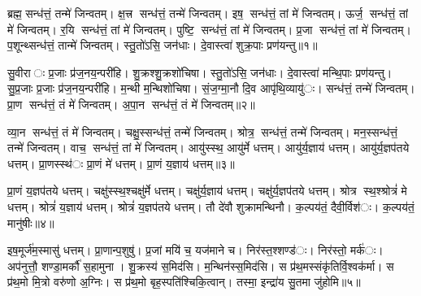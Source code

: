 




ब्रह्म॒ सन्ध॑त्तं॒ तन्मे॑ जिन्वतम्। क्ष॒त्त्र सन्ध॑त्तं॒ तन्मे॑ जिन्वतम्। इष॒ सन्ध॑त्तं॒ तां मे॑ जिन्वतम्। ऊर्ज॒ सन्ध॑त्तं॒ तां मे॑ जिन्वतम्। र॒यि सन्ध॑त्तं॒ तां मे॑ जिन्वतम्। पुष्टि॒ सन्ध॑त्तं॒ तां मे॑ जिन्वतम्। प्र॒जा सन्ध॑त्तं॒ तां मे॑ जिन्वतम्। प॒शून्थ्सन्ध॑त्तं॒ तान्मे॑ जिन्वतम्। स्तु॒तो॑ऽसि॒ जन॑धाः। दे॒वास्त्वा॑ शुक्र॒पाः प्रण॑यन्तु॥१॥

सु॒वीराः प्र॒जाः प्र॑ज॒नय॒न्परी॑हि। शु॒क्रश्शु॒क्रशो॑चिषा। स्तु॒तो॑ऽसि॒ जन॑धाः। दे॒वास्त्वा॑ मन्थि॒पाः प्रण॑यन्तु। सु॒प्र॒जाः प्र॒जाः प्र॑ज॒नय॒न्परी॑हि। म॒न्थी म॒न्थिशो॑चिषा। सं॒ज॒ग्मा॒नौ दि॒व आपृ॑थि॒व्यायु॑ः। सन्ध॑त्तं॒ तन्मे॑ जिन्वतम्। प्रा॒ण सन्ध॑त्तं॒ तं मे॑ जिन्वतम्। अ॒पा॒न सन्ध॑त्तं॒ तं मे॑ जिन्वतम्॥२॥

व्या॒न सन्ध॑त्तं॒ तं मे॑ जिन्वतम्। चक्षु॒स्सन्ध॑त्तं॒ तन्मे॑ जिन्वतम्। श्रोत्र॒ सन्ध॑त्तं॒ तन्मे॑ जिन्वतम्। मन॒स्सन्ध॑त्तं॒ तन्मे॑ जिन्वतम्। वाच॒ सन्ध॑त्तं॒ तां मे॑ जिन्वतम्। आयु॑स्स्थ॒ आयु॑र्मे धत्तम्। आयु॑र्य॒ज्ञाय॑ धत्तम्। आयु॑र्य॒ज्ञप॑तये धत्तम्। प्रा॒णस्स्थ॑ः प्रा॒णं मे॑ धत्तम्। प्रा॒णं य॒ज्ञाय॑ धत्तम्॥३॥

प्रा॒णं य॒ज्ञप॑तये धत्तम्। चक्षु॑स्स्थ॒श्चक्षु॑र्मे धत्तम्। चक्षु॑र्य॒ज्ञाय॑ धत्तम्। चक्षु॑र्य॒ज्ञप॑तये धत्तम्। श्रोत्र स्थ॒श्श्रोत्रं॑ मे धत्तम्। श्रोत्रं॑ य॒ज्ञाय॑ धत्तम्। श्रोत्रं॑ य॒ज्ञप॑तये धत्तम्। तौ दे॑वौ शुक्रामन्थिनौ। क॒ल्पय॑तं॒ दैवी॒र्विश॑ः। क॒ल्पय॑तं॒ मानु॑षीः॥४॥

इष॒मूर्ज॑म॒स्मासु॑ धत्तम्। प्रा॒णान्प॒शुषु॑। प्र॒जां मयि॑ च॒ यज॑माने च। निर॑स्त॒श्शण्ड॑ः। निर॑स्तो॒ मर्क॑ः। अप॑नुत्तौ॒ शण्डा॒मर्कौ॑ स॒हामुना। शु॒क्रस्य॑ स॒मिद॑सि। म॒न्थिन॑स्स॒मिद॑सि। स प्र॑थ॒मस्संकृ॑तिर्वि॒श्वक॑र्मा। स प्र॑थ॒मो मि॒त्रो वरु॑णो अ॒ग्निः। स प्र॑थ॒मो बृह॒स्पति॑श्चिकि॒त्वान्। तस्मा॒ इन्द्रा॑य सु॒तमा जु॑होमि॥५॥\anuvakamend[न॒य॒न्त्व॒पा॒न सन्ध॑त्तं॒ तं मे॑ जिन्वतं प्रा॒णं य॒ज्ञाय॑ धत्तं॒ मानु॑षीर॒ग्निर्द्वे च॑॥ (ब्रह्म॑ क्ष॒त्त्रं तदिष॒मूर्ज र॒यिं पुष्टिं॑ प्र॒जां तां प॒शून्तान्थ्सन्ध॑त्तं॒ तत्प्रा॒णम॑पा॒नं व्या॒नं तं चक्षु॒श्श्रोत्रं॒ मन॒स्तद्वाचं॒ ताम्। इ॒षादि॒पञ्च॑के॒ वाचं॒ तां मे॑ प॒शून्थ्सन्ध॑त्तं॒ तान्मे प्रा॒णादि॒त्रित॑ये॒ तं मे॒ऽन्यत्र॒ तन्मे)]

